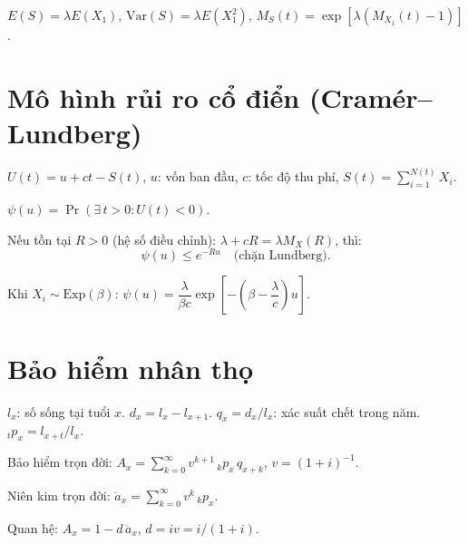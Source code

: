 \documentclass[12pt,a4paper]{article}
\begin{document}
\begin{congthuc}[title={Compound Poisson}]
  $E(S) = \lambda E(X_1)$, $\text{Var}(S) = \lambda E(X_1^2)$, $M_S(t) = \exp[\lambda(M_{X_1}(t) - 1)]$.
\end{congthuc}

\section{Mô hình rủi ro cổ điển (Cramér--Lundberg)}

\begin{dinhnghia}[title={Quá trình thặng dư}]
  $U(t) = u + ct - S(t)$, $u$: vốn ban đầu, $c$: tốc độ thu phí, $S(t) = \sum_{i=1}^{N(t)}X_i$.
\end{dinhnghia}

\begin{dinhnghia}[title={Xác suất phá sản}]
  $\psi(u) = \Pr(\exists\, t > 0: U(t) < 0)$.
\end{dinhnghia}

\begin{dinhly}[title={Phương trình Lundberg}]
  Nếu tồn tại $R > 0$ (hệ số điều chỉnh): $\lambda + cR = \lambda M_X(R)$, thì:
  \[
    \psi(u) \le e^{-Ru} \quad \text{(chặn Lundberg)}.
  \]
\end{dinhly}

\begin{dinhly}[title={Công thức Pollaczek--Khinchine}]
  Khi $X_i \sim \text{Exp}(\beta)$: $\psi(u) = \dfrac{\lambda}{\beta c}\exp\!\left[-\left(\beta - \dfrac{\lambda}{c}\right)u\right]$.
\end{dinhly}

\section{Bảo hiểm nhân thọ}

\begin{dinhnghia}[title={Bảng tử vong}]
  $l_x$: số sống tại tuổi $x$. $d_x = l_x - l_{x+1}$. $q_x = d_x/l_x$: xác suất chết trong năm. $_tp_x = l_{x+t}/l_x$.
\end{dinhnghia}

\begin{congthuc}[title={Giá trị hiện tại bảo hiểm}]
  Bảo hiểm trọn đời: $A_x = \sum_{k=0}^{\infty}v^{k+1}\,{}_kp_x\,q_{x+k}$, $v = (1+i)^{-1}$.

  Niên kim trọn đời: $\ddot{a}_x = \sum_{k=0}^{\infty}v^k\,{}_kp_x$.

  Quan hệ: $A_x = 1 - d\,\ddot{a}_x$, $d = iv = i/(1+i)$.
\end{congthuc}
\end{document}
